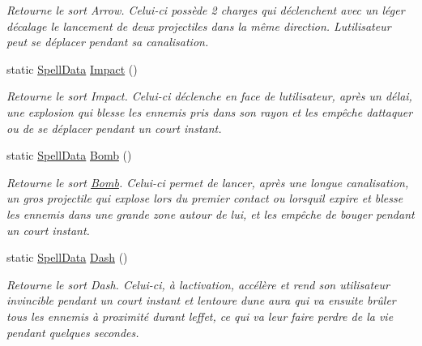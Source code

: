 \begin{DoxyCompactItemize}
\begin{DoxyCompactList}\small\item\em Retourne le sort Arrow. Celui-\/ci possède 2 charges qui déclenchent avec un léger décalage le lancement de deux projectiles dans la même direction. L\textquotesingle{}utilisateur peut se déplacer pendant sa canalisation. \end{DoxyCompactList}\item 
static \hyperlink{class_tentacle_slicers_1_1spells_1_1_spell_data}{Spell\+Data} \hyperlink{class_tentacle_slicers_1_1customs_1_1_spells_a2e91e950b16b11c0d613b3a011a4cbf8}{Impact} ()
\begin{DoxyCompactList}\small\item\em Retourne le sort Impact. Celui-\/ci déclenche en face de l\textquotesingle{}utilisateur, après un délai, une explosion qui blesse les ennemis pris dans son rayon et les empêche d\textquotesingle{}attaquer ou de se déplacer pendant un court instant. \end{DoxyCompactList}\item 
static \hyperlink{class_tentacle_slicers_1_1spells_1_1_spell_data}{Spell\+Data} \hyperlink{class_tentacle_slicers_1_1customs_1_1_spells_a4fe8191cc9ebf12f1519d23d58e711ab}{Bomb} ()
\begin{DoxyCompactList}\small\item\em Retourne le sort \hyperlink{class_tentacle_slicers_1_1customs_1_1_bomb}{Bomb}. Celui-\/ci permet de lancer, après une longue canalisation, un gros projectile qui explose lors du premier contact ou lorsqu\textquotesingle{}il expire et blesse les ennemis dans une grande zone autour de lui, et les empêche de bouger pendant un court instant. \end{DoxyCompactList}\item 
static \hyperlink{class_tentacle_slicers_1_1spells_1_1_spell_data}{Spell\+Data} \hyperlink{class_tentacle_slicers_1_1customs_1_1_spells_af747af60697de1f8dda3cbe8fe5a1c9d}{Dash} ()
\begin{DoxyCompactList}\small\item\em Retourne le sort Dash. Celui-\/ci, à l\textquotesingle{}activation, accélère et rend son utilisateur invincible pendant un court instant et l\textquotesingle{}entoure d\textquotesingle{}une aura qui va ensuite brûler tous les ennemis à proximité durant l\textquotesingle{}effet, ce qui va leur faire perdre de la vie pendant quelques secondes. \end{DoxyCompactList}\item 

\end{DoxyCompactItemize}
